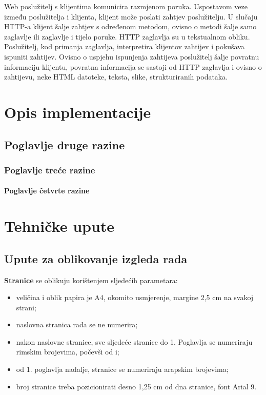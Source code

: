 \documentclass[]{foi} %
\begin{document}
Web poslužitelj s klijentima komunicira razmjenom poruka. Uspostavom veze između poslužitelja i klijenta,
klijent može poslati zahtjev poslužitelju. U slučaju HTTP-a klijent šalje zahtjev s određenom metodom,
ovisno o metodi šalje samo zaglavlje ili zaglavlje i tijelo poruke. HTTP zaglavlja su u tekstualnom obliku.
Poslužitelj, kod primanja zaglavlja, interpretira klijentov zahtijev i pokušava ispuniti zahtijev. Ovisno o
uspjehu ispunjenja zahtijeva poslužitelj šalje povratnu informaciju klijentu, povratna informacija se sastoji
od HTTP zaglavlja i ovisno o zahtijevu, neke HTML datoteke, teksta, slike, strukturiranih podataka.

\chapter{Opis implementacije}

\section{Poglavlje druge razine}

\subsection{Poglavlje treće razine}

\subsubsection{Poglavlje četvrte razine}

\chapter{Tehničke upute}

\section{Upute za oblikovanje izgleda rada}

\textbf{Stranice} se oblikuju korištenjem sljedećih parametara:
\begin{itemize}
	\item veličina i oblik papira je A4, okomito usmjerenje, margine 2,5 cm na svakoj strani;

	\item naslovna stranica rada se ne numerira;

	\item nakon naslovne stranice, sve sljedeće stranice do 1. Poglavlja se numeriraju rimskim brojevima, počevši od i;

	\item od 1. poglavlja nadalje, stranice se numeriraju arapskim brojevima;

	\item broj stranice treba pozicionirati desno 1,25 cm od dna stranice, font Arial 9.
\end{itemize}
\end{document}
